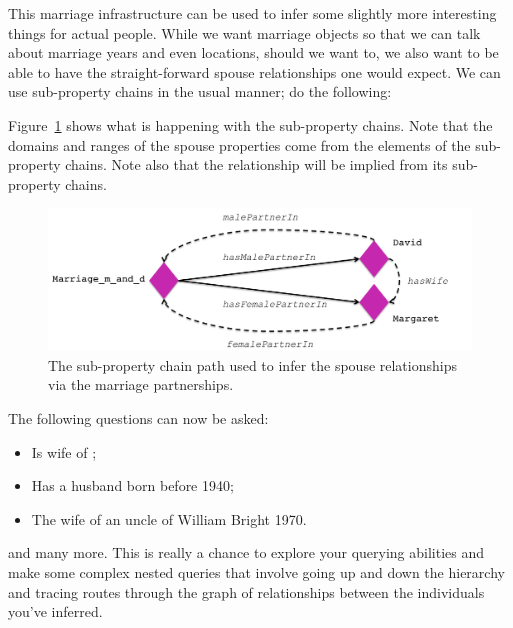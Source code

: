 This marriage infrastructure can be used to infer some slightly more interesting things for actual people. While we want marriage objects so that we can talk about marriage years and even locations, should we want to, we also want to be able to have the straight-forward spouse relationships one would expect. We can use sub-property chains in the usual manner; do the following:


Figure~\ref{fig:spouse} shows what is happening with the sub-property chains. Note that the domains and ranges of the spouse properties come from the elements of the sub-property chains. Note also that the  relationship will be implied from its sub-property chains.

\begin{figure}
\begin{center}
\includegraphics[width=\figwidth]{figures/spouse}
\caption{The sub-property chain path used to infer the spouse relationships via the marriage partnerships.}
\label{fig:spouse}
\end{center}
\end{figure}

The following questions can now be asked:
\begin{itemize}
\item Is wife of \ds;
\item Has a husband born before 1940;
\item The wife of an uncle of William Bright 1970. 
\end{itemize}
\noindent and many more. This is really a chance to explore your querying abilities and make some complex nested queries  that involve going up and down the hierarchy and tracing routes through the  graph of relationships between the individuals you've inferred.

